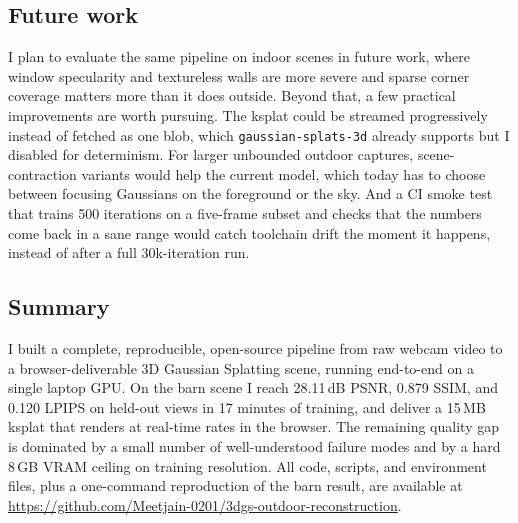 \documentclass[conference]{IEEEtran}
\begin{document}
\subsection{Future work}

I plan to evaluate the same pipeline on indoor scenes in future work, where window specularity and textureless walls are more severe and sparse corner coverage matters more than it does outside. Beyond that, a few practical improvements are worth pursuing. The ksplat could be streamed progressively instead of fetched as one blob, which \texttt{gaussian-splats-3d} already supports but I disabled for determinism. For larger unbounded outdoor captures, scene-contraction variants \cite{barron2022mipnerf360} would help the current model, which today has to choose between focusing Gaussians on the foreground or the sky. And a CI smoke test that trains 500 iterations on a five-frame subset and checks that the numbers come back in a sane range would catch toolchain drift the moment it happens, instead of after a full 30k-iteration run.

\subsection{Summary}

I built a complete, reproducible, open-source pipeline from raw webcam video to a browser-deliverable 3D Gaussian Splatting scene, running end-to-end on a single laptop GPU. On the barn scene I reach 28.11\,dB PSNR, 0.879 SSIM, and 0.120 LPIPS on held-out views in 17 minutes of training, and deliver a 15\,MB ksplat that renders at real-time rates in the browser. The remaining quality gap is dominated by a small number of well-understood failure modes and by a hard 8\,GB VRAM ceiling on training resolution. All code, scripts, and environment files, plus a one-command reproduction of the barn result, are available at \url{https://github.com/Meetjain-0201/3dgs-outdoor-reconstruction}.

\newpage
\end{document}
